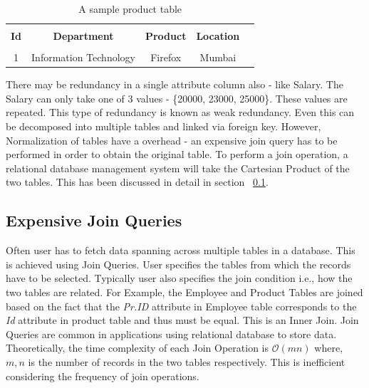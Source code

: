 \documentclass[12pt, oneside]{book}
\begin{document}
\begin{table}
    \centering
    \begin{tabular}{| c | c | c | c | @{}m{0pt}@{}}
    \hline
    \multicolumn{1}{|c|}{} & \multicolumn{1}{c|}{} & \multicolumn{1}{c|}{} & \multicolumn{1}{c|}{} &  \\
    \multicolumn{1}{|c|}{\textbf{Id}} & \multicolumn{1}{c|}{\textbf{Department}} & \multicolumn{1}{c|}{\textbf{Product}} & \multicolumn{1}{c|}{\textbf{Location}} & \\
    \multicolumn{1}{|c|}{} & \multicolumn{1}{c|}{} & \multicolumn{1}{c|}{} & \multicolumn{1}{c|}{} &  \\
    \hline
    1 & Information Technology & Firefox & Mumbai & \\ [1ex] \hline
    \end{tabular}
    \caption{A sample product table}
    \label{tab:product}
\end{table}
There may be redundancy in a single attribute column also - like Salary. The Salary can only take one of 3 values - \{20000, 23000, 25000\}. These values are repeated. This type of redundancy is known as weak redundancy. Even this can be decomposed into multiple tables and linked via foreign key. However, Normalization of tables have a overhead - an expensive join query has to be performed in order to obtain the original table. To perform a join operation, a relational database management system will take the Cartesian Product of the two tables. This has been discussed in detail in section ~\ref{sec:join}. \par
\subsection{Expensive Join Queries}
\label{sec:join}
Often user has to fetch data spanning across multiple tables in a database. This is achieved using Join Queries. User specifies the tables from which the records have to be selected. Typically user also specifies the join condition i.e., how the two tables are related. For Example, the Employee and Product Tables are joined based on the fact that the \emph{Pr.ID} attribute in Employee table corresponds to the \emph{Id} attribute in product table and thus must be equal. This is an Inner Join. Join Queries are common in applications using relational database to store data. Theoretically, the time complexity of each Join Operation is $\mathcal{O}\left( mn \right)$ where, $m, n$ is the number of records in the two tables respectively. This is inefficient considering the frequency of join operations.
\end{document}
